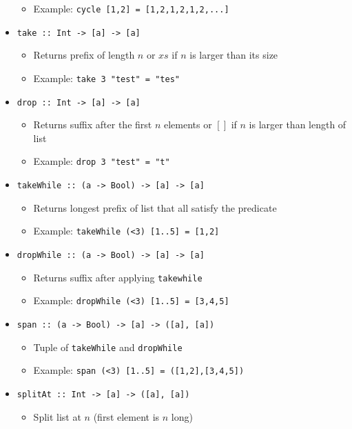 \begin{itemize}
\begin{itemize}
            \item Example: \verb+cycle [1,2] = [1,2,1,2,1,2,...]+
        \end{itemize}
    \item \verb+take :: Int -> [a] -> [a]+
        \begin{itemize}
            \item Returns prefix of length $n$ or $xs$ if $n$ is larger than its size
            \item Example: \verb+take 3 "test" = "tes"+
        \end{itemize}
    \item \verb+drop :: Int -> [a] -> [a]+
        \begin{itemize}
            \item Returns suffix after the first $n$ elements or $[]$ if $n$ is larger than length of list
            \item Example: \verb+drop 3 "test" = "t"+
        \end{itemize}
    \item \verb+takeWhile :: (a -> Bool) -> [a] -> [a]+
        \begin{itemize}
            \item Returns longest prefix of list that all satisfy the predicate
            \item Example: \verb+takeWhile (<3) [1..5] = [1,2]+
        \end{itemize}
    \item \verb+dropWhile :: (a -> Bool) -> [a] -> [a]+
        \begin{itemize}
            \item Returns suffix after applying \verb+takewhile+
            \item Example: \verb+dropWhile (<3) [1..5] = [3,4,5]+
        \end{itemize}
    \item \verb+span :: (a -> Bool) -> [a] -> ([a], [a])+
        \begin{itemize}
            \item Tuple of \verb+takeWhile+ and \verb+dropWhile+
            \item Example: \verb+span (<3) [1..5] = ([1,2],[3,4,5])+
        \end{itemize}
    \item \verb+splitAt :: Int -> [a] -> ([a], [a])+
        \begin{itemize}
            \item Split list at $n$ (first element is $n$ long)

\end{itemize}
\end{itemize}
